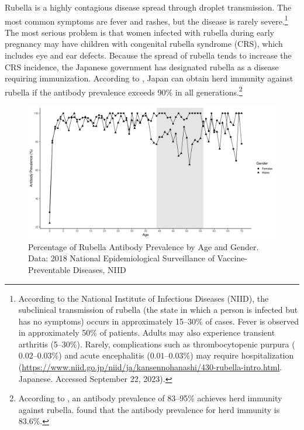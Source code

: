 \documentclass[
]{article}
\begin{document}
Rubella is a highly contagious disease spread through droplet transmission. The most common symptoms are fever and rashes, but the disease is rarely severe.\footnote{According to the National Institute of Infectious Diseases (NIID), the subclinical transmission of rubella (the state in which a person is infected but has no symptoms) occurs in approximately 15--30\% of cases. Fever is observed in approximately 50\% of patients. Adults may also experience transient arthritis (5--30\%). Rarely, complications such as thrombocytopenic purpura (\(0.02\)--\(0.03\)\%) and acute encephalitis (\(0.01\)--\(0.03\)\%) may require hospitalization (\url{https://www.niid.go.jp/niid/ja/kansennohanashi/430-rubella-intro.html}. Japanese. Accessed September 22, 2023).} The most serious problem is that women infected with rubella during early pregnancy may have children with congenital rubella syndrome (CRS), which includes eye and ear defects. Because the spread of rubella tends to increase the CRS incidence, the Japanese government has designated rubella as a disease requiring immunization. According to \citet{Kinoshita2016}, Japan can obtain herd immunity against rubella if the antibody prevalence exceeds 90\% in all generations.\footnote{According to \citet{Plans-Rubio2012}, an antibody prevalence of 83--95\% achieves herd immunity against rubella. \citet{Nishiura2015} found that the antibody prevalence for herd immunity is 83.6\%.}

\begin{figure}[t]
\includegraphics{discussion-paper_files/figure-latex/antibody-1} \caption{Percentage of Rubella Antibody Prevalence by Age and Gender. Data: 2018 National Epidemiological Surveillance of Vaccine-Preventable Diseases, NIID}\label{fig:antibody}
\end{figure}
\end{document}
